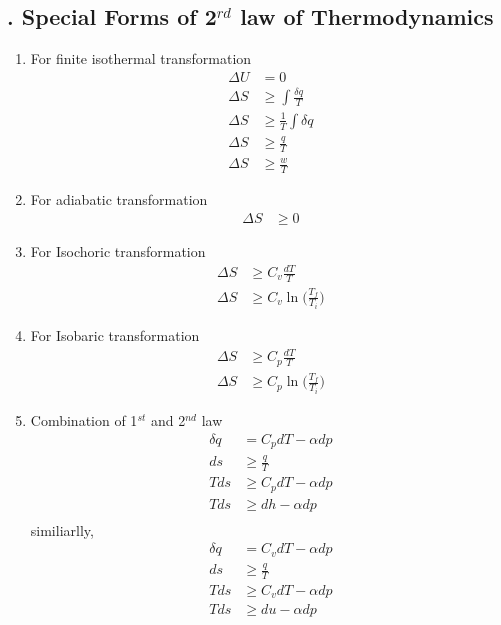 \documentclass[fleqn,10pt]{SelfArx} %
\begin{document}
\subsection{. Special Forms of 2$^{rd}$ law of Thermodynamics}

\begin{enumerate}
    \item For finite isothermal transformation
            \begin{align}
                \Delta U &= 0 \\
                \Delta S &\geq \int \frac{\delta q}{T} \\
                \Delta S &\geq \frac{1}{T} \int \delta q \\
                \Delta S &\geq \frac{q}{T} \\
                \Delta S &\geq \frac{w}{T}
            \end{align}

    \item For adiabatic transformation
            \begin{align}
                \Delta S &\geq 0
            \end{align}

    \item For Isochoric transformation
            \begin{align}
                \Delta S &\geq C_v \frac{d T}{T} \\
                \Delta S &\geq C_v \ln\Big(\frac{T_f}{T_i}\Big)
            \end{align}

    \item For Isobaric transformation
            \begin{align}
                \Delta S &\geq C_p \frac{d T}{T} \\
                \Delta S &\geq C_p \ln\Big(\frac{T_f}{T_i}\Big)
            \end{align}

    \item Combination of 1$^{st}$ and 2$^{nd}$ law
        \begin{align}
            \delta q &= C_p dT - \alpha dp \\
            ds &\geq \frac{q}{T} \\
            Tds &\geq C_p dT - \alpha dp \\
            Tds &\geq dh - \alpha dp \\
        \end{align}
        similiarlly,
        \begin{align}
            \delta q &= C_v dT - \alpha dp \\
            ds &\geq \frac{q}{T} \\
            Tds &\geq C_v dT - \alpha dp \\
            Tds &\geq du - \alpha dp
        \end{align}
\end{enumerate}
\end{document}
